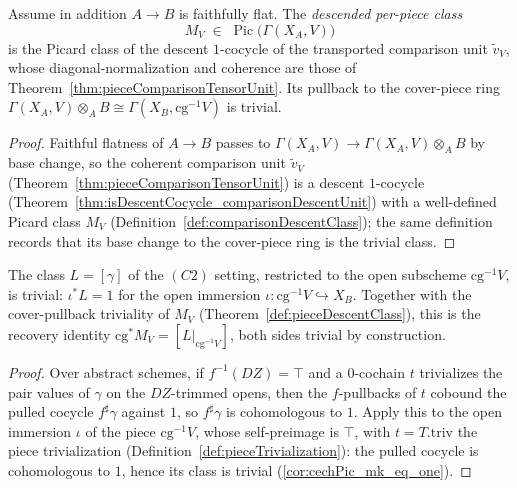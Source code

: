 \begin{theorem}
  \label{def:pieceDescentClass}
  \leanok
  Assume in addition \(A \to B\) is faithfully flat. The \emph{descended per-piece class}
  \[
    M_V \;\in\; \operatorname{Pic}\bigl(\Gamma(X_A, V)\bigr)
  \]
  is the Picard class of the descent \(1\)-cocycle of the transported comparison unit \(\tilde v_V\),
  whose diagonal-normalization and coherence are those of
  Theorem~\ref{thm:pieceComparisonTensorUnit}. Its pullback to the cover-piece ring \(\Gamma(X_A, V)
  \otimes_A B \cong \Gamma(X_B, \mathrm{cg}^{-1}V)\) is trivial.
\end{theorem}
\begin{proof}
  \leanok
  Faithful flatness of \(A \to B\) passes to \(\Gamma(X_A, V) \to \Gamma(X_A, V) \otimes_A B\) by
  base change, so the coherent comparison unit \(\tilde v_V\)
  (Theorem~\ref{thm:pieceComparisonTensorUnit}) is a descent \(1\)-cocycle
  (Theorem~\ref{thm:isDescentCocycle_comparisonDescentUnit}) with a well-defined Picard class
  \(M_V\) (Definition~\ref{def:comparisonDescentClass}); the same definition records that its base
  change to the cover-piece ring is the trivial class.
\end{proof}

\begin{theorem}
  \label{thm:cechPicMap_pieceI_eq_one}
  \leanok
  The class \(L = [\gamma]\) of the \((C2)\) setting, restricted to the open subscheme
  \(\mathrm{cg}^{-1}V\), is trivial: \(\iota^{*}L = 1\) for the open immersion \(\iota \colon
  \mathrm{cg}^{-1}V \hookrightarrow X_B\). Together with the cover-pullback triviality of
  \(M_V\) (Theorem~\ref{def:pieceDescentClass}), this is the recovery identity \(\mathrm{cg}^{*}M_V
  = [L|_{\mathrm{cg}^{-1}V}]\), both sides trivial by construction.
\end{theorem}
\begin{proof}
  \leanok
  Over abstract schemes, if \(f^{-1}(DZ) = \top\) and a \(0\)-cochain \(t\) trivializes the pair
  values of \(\gamma\) on the \(DZ\)-trimmed opens, then the \(f\)-pullbacks of \(t\) cobound the
  pulled cocycle \(f^{\sharp}\gamma\) against \(1\), so \(f^{\sharp}\gamma\) is cohomologous to
  \(1\). Apply this to the open immersion \(\iota\) of the piece \(\mathrm{cg}^{-1}V\), whose
  self-preimage is \(\top\), with \(t = T.\mathrm{triv}\) the piece trivialization
  (Definition~\ref{def:pieceTrivialization}): the pulled cocycle is cohomologous to \(1\), hence its
  class is trivial (\ref{cor:cechPic_mk_eq_one}).
\end{proof}

